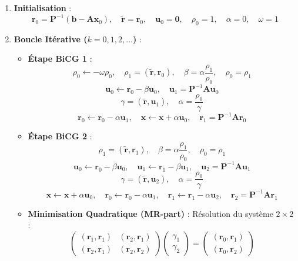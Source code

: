 \documentclass[
  french,
]{article}
\providecommand{\tightlist}{%
  \setlength{\itemsep}{0pt}\setlength{\parskip}{0pt}}
\begin{document}
\begin{enumerate}
\def\labelenumi{\arabic{enumi}.}
\tightlist
\item
  \textbf{Initialisation} :
  \[\mathbf{r}_0 = \mathbf{P}^{-1} (\mathbf{b} - \mathbf{A} \mathbf{x}_0), \quad \tilde{\mathbf{r}} = \mathbf{r}_0, \quad \mathbf{u}_0 = \mathbf{0}, \quad \rho_0 = 1, \quad \alpha = 0, \quad \omega = 1\]
\item
  \textbf{Boucle Itérative (\(k = 0, 1, 2, \dots\))} :

  \begin{itemize}
  \tightlist
  \item
    \textbf{Étape BiCG 1} :
    \[\rho_0 \leftarrow -\omega \rho_0, \quad \rho_1 = (\tilde{\mathbf{r}}, \mathbf{r}_0), \quad \beta = \alpha \frac{\rho_1}{\rho_0}, \quad \rho_0 = \rho_1\]
    \[\mathbf{u}_0 \leftarrow \mathbf{r}_0 - \beta \mathbf{u}_0, \quad \mathbf{u}_1 = \mathbf{P}^{-1} \mathbf{A} \mathbf{u}_0\]
    \[\gamma = (\tilde{\mathbf{r}}, \mathbf{u}_1), \quad \alpha = \frac{\rho_0}{\gamma}\]
    \[\mathbf{r}_0 \leftarrow \mathbf{r}_0 - \alpha \mathbf{u}_1, \quad \mathbf{x} \leftarrow \mathbf{x} + \alpha \mathbf{u}_0, \quad \mathbf{r}_1 = \mathbf{P}^{-1} \mathbf{A} \mathbf{r}_0\]
  \item
    \textbf{Étape BiCG 2} :
    \[\rho_1 = (\tilde{\mathbf{r}}, \mathbf{r}_1), \quad \beta = \alpha \frac{\rho_1}{\rho_0}, \quad \rho_0 = \rho_1\]
    \[\mathbf{u}_0 \leftarrow \mathbf{r}_0 - \beta \mathbf{u}_0, \quad \mathbf{u}_1 \leftarrow \mathbf{r}_1 - \beta \mathbf{u}_1, \quad \mathbf{u}_2 = \mathbf{P}^{-1} \mathbf{A} \mathbf{u}_1\]
    \[\gamma = (\tilde{\mathbf{r}}, \mathbf{u}_2), \quad \alpha = \frac{\rho_0}{\gamma}\]
    \[\mathbf{x} \leftarrow \mathbf{x} + \alpha \mathbf{u}_0, \quad \mathbf{r}_0 \leftarrow \mathbf{r}_0 - \alpha \mathbf{u}_1, \quad \mathbf{r}_1 \leftarrow \mathbf{r}_1 - \alpha \mathbf{u}_2, \quad \mathbf{r}_2 = \mathbf{P}^{-1} \mathbf{A} \mathbf{r}_1\]
  \item
    \textbf{Minimisation Quadratique (MR-part)} : Résolution du système
    \(2 \times 2\) :
    \[\begin{pmatrix} (\mathbf{r}_1, \mathbf{r}_1) & (\mathbf{r}_2, \mathbf{r}_1) \\ (\mathbf{r}_2, \mathbf{r}_1) & (\mathbf{r}_2, \mathbf{r}_2) \end{pmatrix} \begin{pmatrix} \gamma_1 \\ \gamma_2 \end{pmatrix} = \begin{pmatrix} (\mathbf{r}_0, \mathbf{r}_1) \\ (\mathbf{r}_0, \mathbf{r}_2) \end{pmatrix}\]

\end{itemize}
\end{enumerate}
\end{document}
